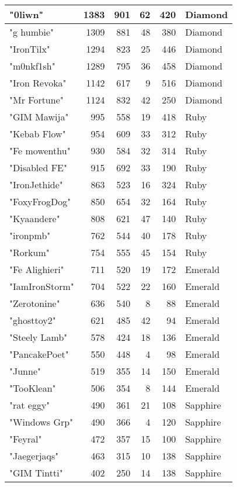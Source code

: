 \documentclass{article}
\begin{document}
\begin{table}[htbp]
\begin{tabular}{|l|r|r|r|r|l|}
"0liwn" & 1383 & 901 & 62 & 420 & Diamond \\ \hline
"g humbie" & 1309 & 881 & 48 & 380 & Diamond \\ \hline
"IronTilx" & 1294 & 823 & 25 & 446 & Diamond \\ \hline
"m0nkf1sh" & 1289 & 795 & 36 & 458 & Diamond \\ \hline
"Iron Revoka" & 1142 & 617 & 9 & 516 & Diamond \\ \hline
"Mr Fortune" & 1124 & 832 & 42 & 250 & Diamond \\ \hline
"GIM Mawija" & 995 & 558 & 19 & 418 & Ruby \\ \hline
"Kebab Flow" & 954 & 609 & 33 & 312 & Ruby \\ \hline
"Fe mowenthu" & 930 & 584 & 32 & 314 & Ruby \\ \hline
"Disabled FE" & 915 & 692 & 33 & 190 & Ruby \\ \hline
"IronJethide" & 863 & 523 & 16 & 324 & Ruby \\ \hline
"FoxyFrogDog" & 850 & 654 & 32 & 164 & Ruby \\ \hline
"Kyaandere" & 808 & 621 & 47 & 140 & Ruby \\ \hline
"ironpmb" & 762 & 544 & 40 & 178 & Ruby \\ \hline
"Rorkum" & 754 & 555 & 45 & 154 & Ruby \\ \hline
"Fe Alighieri" & 711 & 520 & 19 & 172 & Emerald \\ \hline
"IamIronStorm" & 704 & 522 & 22 & 160 & Emerald \\ \hline
"Zerotonine" & 636 & 540 & 8 & 88 & Emerald \\ \hline
"ghosttoy2" & 621 & 485 & 42 & 94 & Emerald \\ \hline
"Steely Lamb" & 578 & 424 & 18 & 136 & Emerald \\ \hline
"PancakePoet" & 550 & 448 & 4 & 98 & Emerald \\ \hline
"Junne" & 519 & 355 & 14 & 150 & Emerald \\ \hline
"TooKlean" & 506 & 354 & 8 & 144 & Emerald \\ \hline
"rat eggy" & 490 & 361 & 21 & 108 & Sapphire \\ \hline
"Windows Grp" & 490 & 366 & 4 & 120 & Sapphire \\ \hline
"Feyral" & 472 & 357 & 15 & 100 & Sapphire \\ \hline
"Jaegerjaqs" & 463 & 315 & 10 & 138 & Sapphire \\ \hline
"GIM Tintti" & 402 & 250 & 14 & 138 & Sapphire \\ \hline

\end{tabular}
\end{table}
\end{document}

